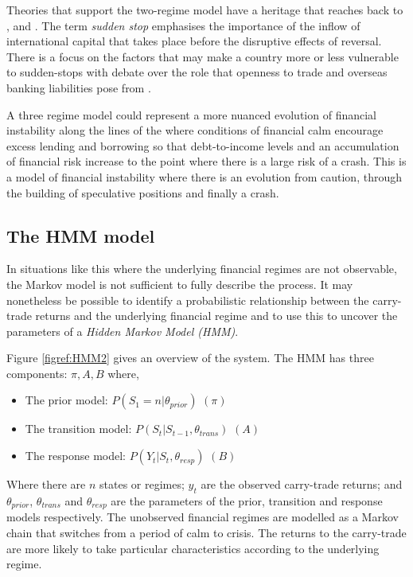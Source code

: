 \documentclass[12pt, a4paper, oneside]{article} %
\begin{document}
Theories that support the two-regime model have a heritage that reaches back to \citet{DornbuschSS}, \citet{CalvoSS} and \citet{KrugmanSS}.  The term \emph{sudden stop} emphasises the importance of the inflow of international capital that takes place before the disruptive effects of reversal.  There is a focus on the factors that may make a country more or less vulnerable to sudden-stops with debate over the role that openness to trade \citet{Cavallo20081430} and overseas banking liabilities pose from \citet{calvo2004empiric}.   
 
A three regime model could represent a more nuanced evolution of financial instability along the lines of the \citet{MinskyKeynes, MinskyFIH, MinskyLongerWaves} where conditions of financial calm encourage excess lending and borrowing so that debt-to-income levels  and an accumulation of financial risk increase to the point where there is a large risk of a crash.  This is a model of financial instability where there is an evolution from caution, through the building of speculative positions and finally a crash.  


\subsection{The HMM model}
In situations like this where the underlying financial regimes are not observable, the Markov model is not sufficient to fully describe the process. It may nonetheless be possible to identify a probabilistic relationship between the carry-trade returns and the underlying financial regime and to use this to uncover the parameters of a \emph{Hidden Markov Model (HMM)}. 


Figure \ref{figref:HMM2} gives an overview of the system.  The HMM has three components: $\pi, A, B$ where,

\begin{itemize}
\item The prior model: $P(S_1 = n| \theta_{prior})$ $(\pi)$
\item The transition model: $P(S_t| S_{t-1}, \theta_{trans})$ $(A)$
\item The response model: $P(Y_t| S_t, \theta_{resp})$ $(B)$
\end{itemize}

Where there are $n$ states or regimes; $y_t$ are the observed carry-trade returns; and $\theta_{prior}$, $\theta_{trans}$ and  $\theta_{resp}$ are the parameters of the prior, transition and response models respectively. The unobserved financial regimes are modelled as a Markov chain that switches from a period of calm to crisis.  The returns to the carry-trade are more likely to take particular characteristics according to the underlying regime.   
\end{document}

